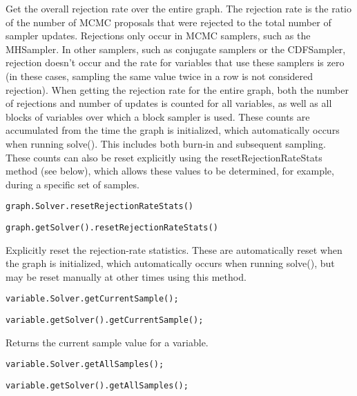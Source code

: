 Get the overall rejection rate over the entire graph.  The rejection rate is the ratio of the number of MCMC proposals that were rejected to the total number of sampler updates.  Rejections only occur in MCMC samplers, such as the MHSampler.  In other samplers, such as conjugate samplers or the CDFSampler, rejection doesn't occur and the rate for variables that use these samplers is zero (in these cases, sampling the same value twice in a row is not considered rejection).  When getting the rejection rate for the entire graph, both the number of rejections and number of updates is counted for all variables, as well as all blocks of variables over which a block sampler is used.  These counts are accumulated from the time the graph is initialized, which automatically occurs when running solve().  This includes both burn-in and subsequent sampling.  These counts can also be reset explicitly using the resetRejectionRateStats method (see below), which allows these values to be determined, for example, during a specific set of samples.

\ifmatlab
\begin{lstlisting}
graph.Solver.resetRejectionRateStats()
\end{lstlisting}
\fi

\ifjava
\begin{lstlisting}
graph.getSolver().resetRejectionRateStats()
\end{lstlisting}
\fi

Explicitly reset the rejection-rate statistics.  These are automatically reset when the graph is initialized, which automatically occurs when running solve(), but may be reset manually at other times using this method.



\ifmatlab
\begin{lstlisting}
variable.Solver.getCurrentSample();
\end{lstlisting}
\fi

\ifjava
\begin{lstlisting}
variable.getSolver().getCurrentSample();
\end{lstlisting}
\fi

Returns the current sample value for a variable.

\ifmatlab
\begin{lstlisting}
variable.Solver.getAllSamples();
\end{lstlisting}
\fi

\ifjava
\begin{lstlisting}
variable.getSolver().getAllSamples();
\end{lstlisting}
\fi

